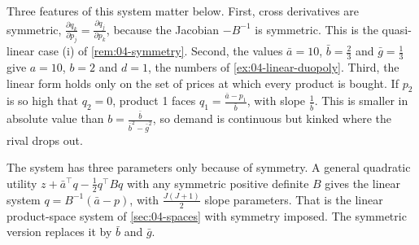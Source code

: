 Three features of this system matter below. First, cross derivatives are symmetric,
$\frac{\partial q_k}{\partial p_j} = \frac{\partial q_j}{\partial p_k}$, because the Jacobian $-B^{-1}$ is symmetric. This
is the quasi-linear case (i) of \cref{rem:04-symmetry}. Second, the values $\bar a = 10$, $\bar b = \frac{2}{3}$ and
$\bar g = \frac{1}{3}$ give $a = 10$, $b = 2$ and $d = 1$, the numbers of \cref{ex:04-linear-duopoly}. Third, the
linear form holds only on the set of prices at which every product is bought. If $p_2$ is so high that $q_2 = 0$,
product 1 faces $q_1 = \frac{\bar a - p_1}{\bar b}$, with slope $\frac{1}{\bar b}$. This is smaller in absolute value
than $b = \frac{\bar b}{\bar b^2 - \bar g^2}$, so demand is continuous but kinked where the rival drops out.

The system has three parameters only because of symmetry. A general quadratic utility
$z + \bar a^\top q - \frac{1}{2}q^\top Bq$ with any symmetric positive definite $B$ gives the linear system
$q = B^{-1}(\bar a - p)$, with $\frac{J(J+1)}{2}$ slope parameters. That is the linear product-space system of
\cref{sec:04-spaces} with symmetry imposed. The symmetric version replaces it by $\bar b$ and $\bar g$.

